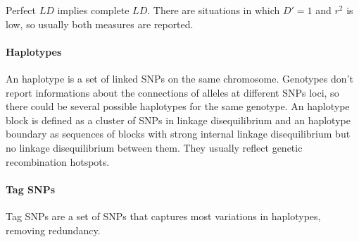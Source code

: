 				Perfect $LD$ implies complete $LD$.
				There are situations in which $D'=1$ and $r^2$ is low, so usually both measures are reported.

			\paragraph{Haplotypes}
			An haplotype is a set of linked SNPs on the same chromosome.
			Genotypes don't report informations about the connections of alleles at different SNPs loci, so there could be several possible haplotypes for the same genotype.
			An haplotype block is defined as a cluster of SNPs in linkage disequilibrium and an haplotype boundary as sequences of blocks with strong internal linkage disequilibrium but no linkage disequilibrium between them.
			They usually reflect genetic recombination hotspots.

			\paragraph{Tag SNPs}
			Tag SNPs are a set of SNPs that captures most variations in haplotypes, removing redundancy.
